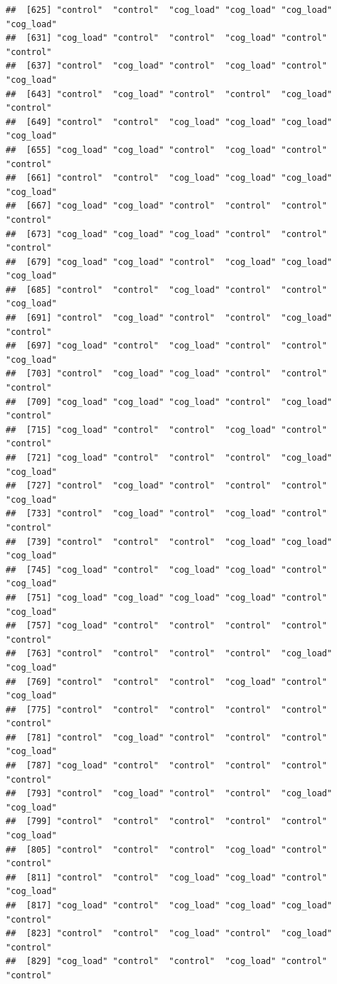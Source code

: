 \documentclass[
  american,
  man,floatsintext]{apa7}
\begin{document}
\begin{verbatim}
##  [625] "control"  "control"  "cog_load" "cog_load" "cog_load" "cog_load"
##  [631] "cog_load" "control"  "control"  "cog_load" "control"  "control" 
##  [637] "control"  "cog_load" "control"  "cog_load" "control"  "cog_load"
##  [643] "control"  "cog_load" "control"  "control"  "cog_load" "control" 
##  [649] "control"  "control"  "cog_load" "cog_load" "cog_load" "cog_load"
##  [655] "cog_load" "cog_load" "control"  "cog_load" "control"  "control" 
##  [661] "control"  "control"  "cog_load" "cog_load" "cog_load" "cog_load"
##  [667] "cog_load" "cog_load" "control"  "control"  "control"  "control" 
##  [673] "cog_load" "cog_load" "cog_load" "control"  "control"  "control" 
##  [679] "cog_load" "cog_load" "control"  "cog_load" "cog_load" "cog_load"
##  [685] "control"  "control"  "cog_load" "control"  "control"  "cog_load"
##  [691] "control"  "cog_load" "control"  "control"  "cog_load" "control" 
##  [697] "cog_load" "control"  "cog_load" "control"  "control"  "cog_load"
##  [703] "control"  "cog_load" "cog_load" "control"  "control"  "control" 
##  [709] "cog_load" "cog_load" "cog_load" "control"  "cog_load" "control" 
##  [715] "cog_load" "control"  "control"  "cog_load" "control"  "control" 
##  [721] "cog_load" "control"  "control"  "control"  "cog_load" "cog_load"
##  [727] "control"  "cog_load" "control"  "control"  "control"  "cog_load"
##  [733] "control"  "cog_load" "control"  "cog_load" "control"  "control" 
##  [739] "control"  "control"  "control"  "cog_load" "cog_load" "cog_load"
##  [745] "cog_load" "control"  "cog_load" "cog_load" "control"  "cog_load"
##  [751] "cog_load" "cog_load" "cog_load" "cog_load" "control"  "cog_load"
##  [757] "cog_load" "control"  "control"  "control"  "control"  "control" 
##  [763] "control"  "control"  "control"  "control"  "cog_load" "cog_load"
##  [769] "control"  "control"  "control"  "cog_load" "control"  "cog_load"
##  [775] "control"  "control"  "control"  "control"  "control"  "control" 
##  [781] "control"  "cog_load" "control"  "control"  "control"  "cog_load"
##  [787] "cog_load" "control"  "control"  "control"  "control"  "control" 
##  [793] "control"  "cog_load" "control"  "control"  "cog_load" "cog_load"
##  [799] "control"  "control"  "control"  "control"  "control"  "cog_load"
##  [805] "control"  "control"  "control"  "cog_load" "control"  "control" 
##  [811] "control"  "control"  "cog_load" "cog_load" "control"  "cog_load"
##  [817] "cog_load" "control"  "cog_load" "cog_load" "cog_load" "control" 
##  [823] "control"  "control"  "cog_load" "control"  "cog_load" "control" 
##  [829] "cog_load" "control"  "control"  "cog_load" "control"  "control" 

\end{verbatim}
\end{document}
